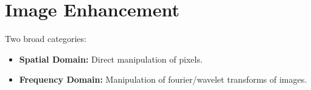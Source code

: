 \section*{Image Enhancement}

Two broad categories:

\begin{itemize}
  \item \textbf{Spatial Domain:} Direct manipulation of pixels.
  \item \textbf{Frequency Domain:} Manipulation of fourier/wavelet
    transforms of images.
\end{itemize}
